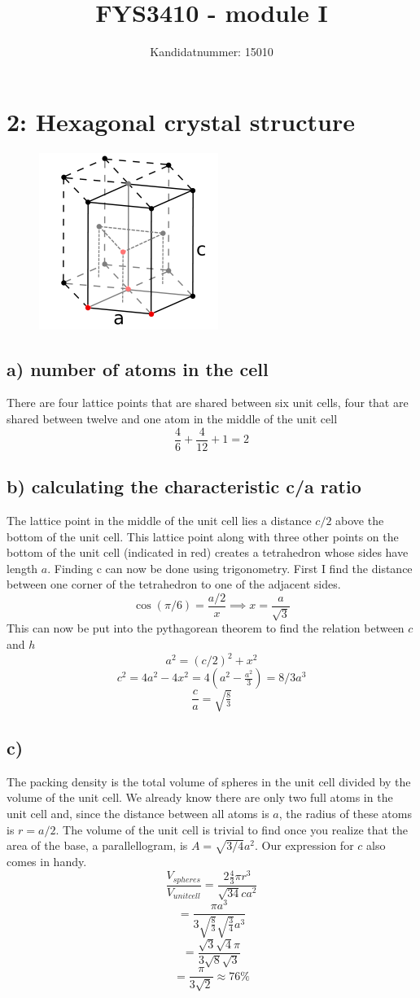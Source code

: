 \documentclass[a4paper, 11pt]{article}
\author{Kandidatnummer: 15010}
\title{FYS3410 - module I}
\begin{document}
\maketitle
	\section*{2: Hexagonal crystal structure}
		\begin{figure}[H]
			\centering
			\includegraphics{hcp_edited.png}
		\end{figure}
		\subsection*{a) number of atoms in the cell}
			There are four lattice points that are shared between six unit cells, four that are shared between twelve and one atom in the middle of the unit cell
			$$\frac{4}{6}+\frac{4}{12}+1 = 2$$
		\subsection*{b) calculating the characteristic c/a ratio}
			The lattice point in the middle of the unit cell lies a distance $c/2$ above the bottom of the unit cell. This lattice point along with three other points on the bottom of the unit cell (indicated in red) creates a tetrahedron whose sides have length $a$. Finding c can now be done using trigonometry. First I find the distance between one corner of the tetrahedron to one of the adjacent sides.
			$$\cos(\pi /6) = \frac{a/2}{x} \implies x = \frac{a}{\sqrt{3}}$$
			This can now be put into the pythagorean theorem to find the relation between $c$ and $h$
			$$a^2 = (c/2)^2 + x^2$$
			$$c^2 = 4a^2-4x^2 = 4(a^2-\tfrac{a^2}{3})=8/3a^3$$
			$$\frac{c}{a}=\sqrt{\tfrac{8}{3}}$$
		\subsection*{c)}
			The packing density is the total volume of spheres in the unit cell divided by the volume of the unit cell. We already know there are only two full atoms in the unit cell and, since the distance between all atoms is $a$, the radius of these atoms is $r=a/2$. The volume of the unit cell is trivial to find once you realize that the area of the base, a parallellogram, is $A=\sqrt{3/4}a^2$. Our expression for $c$ also comes in handy.
			$$\frac{V_{spheres}}{V_{unit cell}}=\frac{ 2\tfrac{4}{3}\pi r^3 }{ \sqrt{{3}{4}} ca^2}$$
			$$= \frac{ \pi a^3 }{ 3\sqrt{\tfrac{8}{3}} \sqrt{\tfrac{3}{4}} a^3} $$
			$$=\frac{\sqrt{3}\sqrt{4}\pi}{3\sqrt{8}\sqrt{3}}$$
			$$=\frac{\pi}{3\sqrt{2}}\approx 76\%$$
\end{document}
